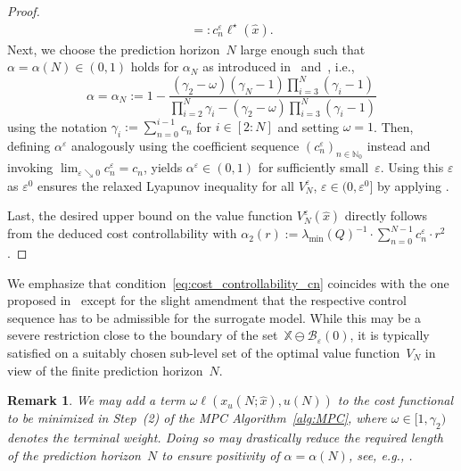 \documentclass{article}
\numberwithin{equation}{section}
\newtheorem{remark}[theorem]{Remark}
\newcommand{\bX}{\mathbb X}
\begin{document}
\begin{proof}
\begin{align*}
		=:  c_n^\varepsilon \ell^\star(\hat{x}).
		\end{align*}
		Next, we choose the prediction horizon~$N$ large enough such that $\alpha = \alpha(N) \in (0,1)$ holds for $\alpha_N$ as introduced in~\cite[Theorem~5.4]{GrunPann10} and~\cite{Wort11}, i.e.,
		\begin{equation}\label{eq:alpha}
		\alpha = \alpha_N := 1 - \frac {(\gamma_2 - \omega) (\gamma_N - 1) \prod_{i=3}^N (\gamma_i - 1)} {\prod_{i=2}^N \gamma_i - (\gamma_2 - \omega) \prod_{i=3}^N (\gamma_i - 1)}
		\end{equation}
		using the notation $\gamma_i := \sum_{n=0}^{i-1} c_n$ for $i \in [2:N]$ and setting $\omega = 1$.
		Then, defining $\alpha^\varepsilon$ analogously using the coefficient sequence $(c_n^\varepsilon)_{n \in \mathbb{N}_0}$ instead and invoking $\lim_{\varepsilon \searrow 0} c_n^\varepsilon = c_n$, yields $\alpha^\varepsilon \in (0,1)$ for sufficiently small~$\varepsilon$. 
		Using this $\varepsilon$ as $\varepsilon^0$ ensures the relaxed Lyapunov inequality for all $V_N^\varepsilon$, $\varepsilon \in (0,\varepsilon^0]$ by applying \cite[Theorem 5.2]{Grun09}.
		
		Last, the desired upper bound on the value function $V_N^\varepsilon(\hat{x})$ directly follows from the deduced cost controllability with $\alpha_2(r) :=  \lambda_{\min}(Q)^{-1} \cdot \sum_{n=0}^{N-1} c_n^\varepsilon \cdot r^2$.
	\end{proof}
	We emphasize that condition~\eqref{eq:cost_controllability_cn} coincides with the one proposed in~\cite{Grun09} except for the slight amendment that the respective control sequence has to be admissible for the surrogate model. While this may be a severe restriction close to the boundary of the set~$\bX \ominus \mathcal{B}_\varepsilon(0)$, it is typically 
	satisfied on a suitably chosen sub-level set of the optimal value function~$V_N$ in view of the finite prediction horizon~$N$.
	\begin{remark}
		We may add a term $\omega \ell(x_u(N;\hat{x}),u(N))$ to the cost functional to be minimized in Step~(2) of the MPC Algorithm~\ref{alg:MPC}, where $\omega \in [1,\gamma_2)$ denotes the terminal weight. Doing so may drastically reduce the required length of the prediction horizon~$N$ to ensure positivity of $\alpha = \alpha(N)$, see, e.g., \cite{Wort11}. 
	\end{remark}
	
\end{document}
